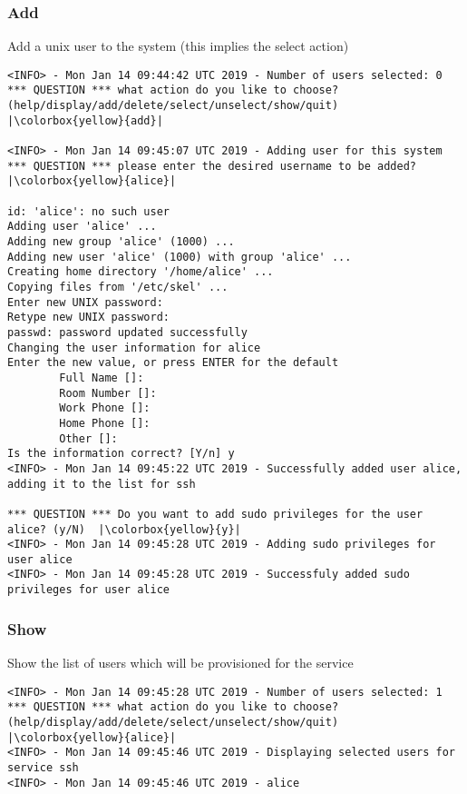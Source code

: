  \subsubsection{Add}
 Add a unix user to the system (this implies the select action)
 \begin{lstlisting}[escapeinside=||]
<INFO> - Mon Jan 14 09:44:42 UTC 2019 - Number of users selected: 0
*** QUESTION *** what action do you like to choose? (help/display/add/delete/select/unselect/show/quit)  |\colorbox{yellow}{add}|
                                                                                                                                                                                                                                                                                                                                              
<INFO> - Mon Jan 14 09:45:07 UTC 2019 - Adding user for this system
*** QUESTION *** please enter the desired username to be added?  |\colorbox{yellow}{alice}|

id: 'alice': no such user
Adding user 'alice' ...
Adding new group 'alice' (1000) ...
Adding new user 'alice' (1000) with group 'alice' ...
Creating home directory '/home/alice' ...
Copying files from '/etc/skel' ...
Enter new UNIX password:
Retype new UNIX password:
passwd: password updated successfully
Changing the user information for alice
Enter the new value, or press ENTER for the default
        Full Name []:
        Room Number []:
        Work Phone []:
        Home Phone []:
        Other []:
Is the information correct? [Y/n] y
<INFO> - Mon Jan 14 09:45:22 UTC 2019 - Successfully added user alice, adding it to the list for ssh

*** QUESTION *** Do you want to add sudo privileges for the user alice? (y/N)  |\colorbox{yellow}{y}|
<INFO> - Mon Jan 14 09:45:28 UTC 2019 - Adding sudo privileges for user alice
<INFO> - Mon Jan 14 09:45:28 UTC 2019 - Successfuly added sudo privileges for user alice
 \end{lstlisting}
 
 \subsubsection{Show}
 Show the list of users which will be provisioned for the service
 \begin{lstlisting}[escapeinside=||]
<INFO> - Mon Jan 14 09:45:28 UTC 2019 - Number of users selected: 1
*** QUESTION *** what action do you like to choose? (help/display/add/delete/select/unselect/show/quit)  |\colorbox{yellow}{alice}|
<INFO> - Mon Jan 14 09:45:46 UTC 2019 - Displaying selected users for service ssh
<INFO> - Mon Jan 14 09:45:46 UTC 2019 - alice
 \end{lstlisting}
 
